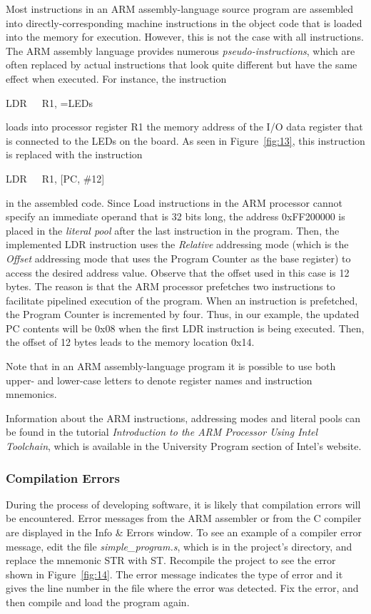 \documentclass[11pt, twoside, pdftex]{article}
\begin{document}
Most instructions in an ARM assembly-language source program are
assembled into directly-corresponding machine instructions in
the object code that is loaded into the memory for execution.
However, this is not the case with all instructions. The ARM
assembly language provides numerous {\it pseudo-instructions},
which are often replaced by actual instructions that look
quite different but have the same effect when executed.
For instance, the instruction 
\begin{center}
LDR~~~R1, =LEDs
\end{center}
\noindent
loads into processor register R1 the memory address of the I/O
data register that is connected to the LEDs on the board.
As seen in Figure~\ref{fig:13}, this instruction is replaced with the 
instruction 
\begin{center}
LDR~~~R1, [PC, \#12]
\end{center}
\noindent
in the assembled code. Since Load instructions in the ARM
processor cannot specify an immediate operand that is 32 bits 
long, the address 0xFF200000 is placed in the {\it literal pool}
after the last instruction in the program. Then, the implemented
LDR instruction uses the {\it Relative} addressing mode (which
is the {\it Offset} addressing mode that uses the Program Counter
as the base register) to access the desired address value. Observe that the offset used in this case is 12 bytes.
The reason is that the ARM processor prefetches two instructions
to facilitate pipelined execution of the program. 
When an instruction is prefetched, the Program Counter is
incremented by four. Thus, in our example, the updated
PC contents will be 0x08 when the first LDR instruction is
being executed. Then, the offset of 12 bytes leads to the memory
location 0x14.
 
Note that in an ARM assembly-language program it is possible to
use both upper- and lower-case letters to denote register names
and instruction mnemonics.

Information about the ARM instructions, addressing modes and
literal pools can be found in the tutorial
{\it Introduction to the ARM Processor Using Intel Toolchain},
which is available in the University Program section of Intel's
website. 

\subsubsection{Compilation Errors}
\label{sec:3.2.1}

During the process of developing software, it is likely that compilation errors will be 
encountered. Error messages from the ARM assembler or from the C compiler are displayed in the \textsf{Info \& Errors} window. 
To see an example of a compiler error message, edit
the file {\it simple\_program.s}, which is in the project's directory, and replace the mnemonic STR with ST.
Recompile the project to see the error shown in Figure~\ref{fig:14}. 
The error message indicates the type of error and it gives the
line number in the file where the error was detected. Fix the
error, and then compile and load the program again.
\end{document}
